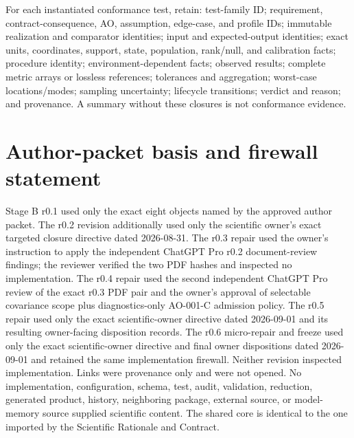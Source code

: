 \documentclass[10pt]{article}
\begin{document}
For each instantiated conformance test, retain: test-family ID; requirement,
contract-consequence, AO, assumption, edge-case, and profile IDs; immutable realization
and comparator identities; input and expected-output identities; exact units,
coordinates, support, state, population, rank/null, and calibration facts;
procedure identity; environment-dependent facts; observed results; complete
metric arrays or lossless references; tolerances and aggregation; worst-case
locations/modes; sampling uncertainty; lifecycle transitions; verdict and
reason; and provenance. A summary without these closures is not conformance
evidence.

\section{Author-packet basis and firewall statement}

Stage B r0.1 used only the exact eight objects named by the approved author
packet. The r0.2 revision additionally used only the scientific owner's exact
targeted closure directive dated 2026-08-31. The r0.3 repair used the owner's
instruction to apply the independent ChatGPT Pro r0.2 document-review findings;
the reviewer verified the two PDF hashes and inspected no implementation. The
r0.4 repair used the second independent ChatGPT Pro review of the exact r0.3
PDF pair and the owner's approval of selectable covariance scope plus
diagnostics-only AO-001-C admission policy. The r0.5 repair used only the exact
scientific-owner directive dated 2026-09-01 and its resulting owner-facing
disposition records. The r0.6 micro-repair and freeze used only the exact
scientific-owner directive and final owner dispositions dated 2026-09-01 and
retained the same implementation firewall.
Neither revision inspected implementation.
Links were provenance only and were not opened. No implementation,
configuration, schema, test, audit, validation, reduction, generated product,
history, neighboring package, external source, or model-memory source supplied
scientific content. The shared core is identical to the one imported by the
Scientific Rationale and Contract.
\end{document}
